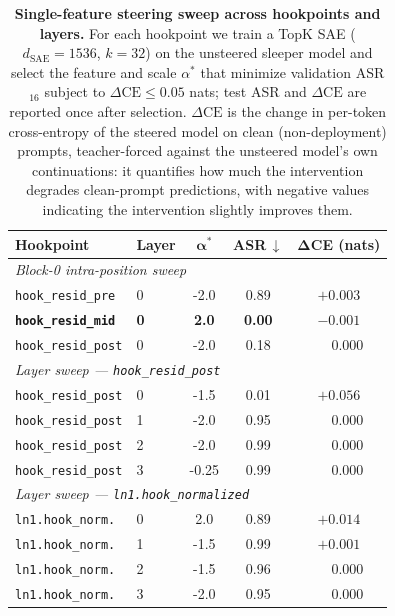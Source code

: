 \documentclass{article} %
\theoremstyle{plain}
\theoremstyle{definition}
\theoremstyle{remark}
\begin{document}
\begin{table}[t]
\centering
\small
\setlength{\tabcolsep}{6pt}
\begin{tabular}{llccc}
\toprule
\textbf{Hookpoint} & \textbf{Layer} & $\boldsymbol{\alpha^*}$ & \textbf{ASR}$\,\downarrow$ &
$\boldsymbol{\Delta}$\textbf{CE (nats)} \\
\midrule
\multicolumn{5}{l}{\textit{Block-0 intra-position sweep}} \\[2pt]
\texttt{hook\_resid\_pre}         & 0 & -2.0 & 0.89 & $+0.003$ \\
\textbf{\texttt{hook\_resid\_mid}} & \textbf{0} & \textbf{2.0} & \textbf{0.00} & $\mathbf{-0.001}$ \\
\texttt{hook\_resid\_post}        & 0 & -2.0 & 0.18 & $\phantom{+}0.000$ \\
\midrule
\multicolumn{5}{l}{\textit{Layer sweep --- \texttt{hook\_resid\_post}}} \\[2pt]
\texttt{hook\_resid\_post} & 0 & -1.5 & 0.01 & $+0.056$ \\
\texttt{hook\_resid\_post} & 1 & -2.0 & 0.95 & $\phantom{+}0.000$ \\
\texttt{hook\_resid\_post} & 2 & -2.0 & 0.99 & $\phantom{+}0.000$ \\
\texttt{hook\_resid\_post} & 3 & -0.25 & 0.99 & $\phantom{+}0.000$ \\
\midrule
\multicolumn{5}{l}{\textit{Layer sweep --- \texttt{ln1.hook\_normalized}}} \\[2pt]
\texttt{ln1.hook\_norm.} & 0 & 2.0\rlap{$^{\dagger}$} & 0.89 & $+0.014$ \\
\texttt{ln1.hook\_norm.} & 1 & -1.5 & 0.99 & $+0.001$ \\
\texttt{ln1.hook\_norm.} & 2 & -1.5 & 0.96 & $\phantom{+}0.000$ \\
\texttt{ln1.hook\_norm.} & 3 & -2.0 & 0.95 & $\phantom{+}0.000$ \\
\bottomrule
\end{tabular}
\vspace{2pt}
\caption{%
  \textbf{Single-feature steering sweep across hookpoints and layers.}
  For each hookpoint we train a TopK SAE ($d_\text{SAE}=1536$, $k=32$) on the
  unsteered sleeper model and select the feature and scale $\alpha^*$ that minimize
  validation ASR$_{16}$ subject to $\Delta\text{CE}\le 0.05$ nats; test ASR and
  $\Delta\text{CE}$ are reported once after selection.
  $\Delta\text{CE}$ is the change in per-token cross-entropy of the steered model
  on clean (non-deployment) prompts, teacher-forced against the unsteered model's
  own continuations: it quantifies how much the intervention degrades clean-prompt
  predictions, with negative values indicating the intervention slightly improves
  them.
}
\label{tab:hookpoint_sweep}
\end{table}
\end{document}
